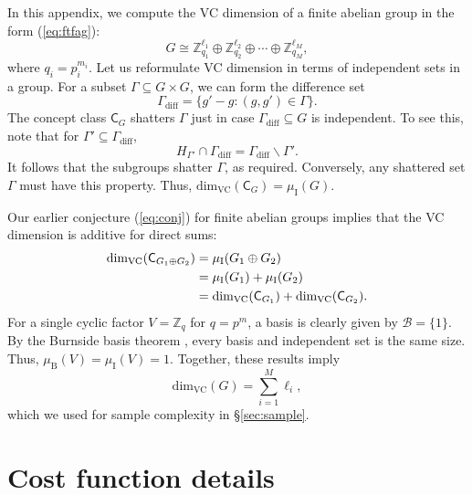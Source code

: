 \documentclass[aps, pre,reprint,nofootinbib,citeautoscript,floatfix]{revtex4-1}
\begin{document}
In this appendix, we compute the VC dimension of a finite abelian group in the form
(\ref{eq:ftfag}):
\[
  G \cong \mathbb{Z}_{q_1}^{\ell_1} \oplus \mathbb{Z}_{q_2}^{\ell_2}
  \oplus \cdots \oplus \mathbb{Z}_{q_M}^{\ell_M},
\]
where $q_i = p_i^{m_i}$.
Let  us reformulate VC dimension in terms of independent sets in a group.
For a subset $\Gamma \subseteq G \times G$, we can form the difference
set
\begin{equation}
  \label{eq:51}
  \Gamma_\text{diff} = \{g'-g: (g, g') \in \Gamma\}.
\end{equation}
The concept class $\mathsf{C}_G$ shatters $\Gamma$ just in case
$\Gamma_\text{diff} \subseteq G$ is independent.
To see this, note that for $\Gamma' \subseteq
\Gamma_\text{diff}$,
\begin{equation}
  \label{eq:56}
  H_{\Gamma'} \cap \Gamma_\text{diff} = \Gamma_\text{diff}\backslash \Gamma'.
\end{equation}
It follows that the subgroups shatter $\Gamma$, as required.
Conversely, any shattered set $\Gamma$ must have this property.
Thus, $\text{dim}_\text{VC}(\mathsf{C}_G) = \mu_\text{I}(G)$.

Our earlier conjecture (\ref{eq:conj}) for finite abelian groups
implies that the VC dimension is additive for direct sums:
\begin{align}
\text{dim}_\text{VC}(\mathsf{C}_{G_1 \oplus G_2}) & = \mu_\text{I}(G_1
                                                    \oplus G_2) \notag
  \\
  & = \mu_\text{I}(G_1) +\mu_\text{I}(G_2) \notag \\
& = \text{dim}_\text{VC}(\mathsf{C}_{G_1}) + \text{dim}_\text{VC}(\mathsf{C}_{G_2}).\label{eq:17}
\end{align}
For a single cyclic factor $V = \mathbb{Z}_q$ for $q = p^m$, a basis
is clearly given by $\mathcal{B} = \{1\}$. By the Burnside basis
theorem \cite{MCDOUGALLBAGNALL2011332}, every basis and independent
set is the same size.
Thus, $\mu_\text{B}(V) = \mu_\text{I}(V) = 1$.
Together, these results imply
\begin{equation}
  \label{eq:20}
  \text{dim}_\text{VC}(G) = \sum_{i=1}^M \ell_i,
\end{equation}
which we used for sample complexity in \S\ref{sec:sample}.


\section{Cost function details}
\label{sec:cost-funct-deta}
\end{document}
